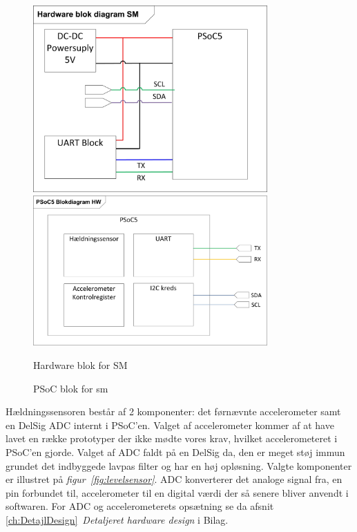 \begin{figure}[H]
	\centering
	\begin{minipage}[b]{0.48\textwidth}\centering
	\includegraphics[width=0.80\textwidth]{billeder/SMHardware}
	\end{minipage}
	\begin{minipage}[b]{0.48\textwidth}\centering
	\includegraphics[width=0.80\textwidth]{billeder/SMPSoCblock}
	\end{minipage}
	\begin{minipage}[t]{0.48\textwidth}
	\caption{Hardware blok for SM}
	\label{fig:SMHW1}
	\end{minipage}
	\begin{minipage}[t]{0.48\textwidth}
	\caption{PSoC blok for sm}
	\label{fig:SMPSOC1}
	\end{minipage}
\end{figure}
Hældningssensoren består af 2 komponenter: det førnævnte accelerometer samt en DelSig ADC internt i PSoC'en. Valget af accelerometer kommer af at have lavet en række prototyper der ikke mødte vores krav, hvilket accelerometeret i PSoC'en gjorde. Valget af ADC faldt på en DelSig da, den er meget støj immun grundet det indbyggede lavpas filter og har en høj opløsning. Valgte komponenter er illustret på \textit{figur~\ref{fig:levelsensor}}. ADC konverterer det analoge signal fra, en pin forbundet til, accelerometer til en digital værdi der så senere bliver anvendt i softwaren. For ADC og accelerometerets opsætning se da afsnit \ref{ch:DetajlDesign}~\textit{Detaljeret hardware design} i Bilag.
